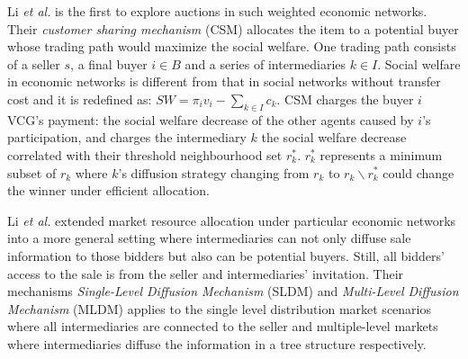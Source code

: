 \documentclass{article}
\begin{document}
Li \emph{et al.}  is the first to explore auctions in such weighted economic networks. Their \emph{customer sharing mechanism} (CSM) allocates the item to a potential buyer whose trading path would maximize the social welfare. One trading path consists of a seller $s$, a final buyer $i\in B$ and a series of intermediaries $k \in I$. Social welfare in economic networks is different from that in social networks without transfer cost and it is redefined as: $SW=\pi_i v_i - \sum_{k\in I} c_k$. CSM charges the buyer $i$ VCG's payment: the social welfare decrease of the other agents caused by $i$'s participation, and charges the intermediary $k$ the social welfare decrease correlated with their threshold neighbourhood set $r_{k}^{\ast}$. $r_{k}^{\ast}$ represents a minimum subset of $r_k$ where $k$'s diffusion strategy changing from $r_k$ to $r_k\backslash r_{k}^{\ast}$ could change the winner under efficient allocation.

Li \emph{et al.}  extended market resource allocation under particular economic networks into a more general setting where intermediaries can not only diffuse sale information to those bidders but also can be potential buyers. Still, all bidders' access to the sale is from the seller and intermediaries' invitation. Their mechanisms \emph{Single-Level Diffusion Mechanism} (SLDM) and \emph{Multi-Level Diffusion Mechanism} (MLDM) applies to the single level distribution market scenarios where all intermediaries are connected to the seller and multiple-level markets where intermediaries diffuse the information in a tree structure respectively. 
\end{document}
